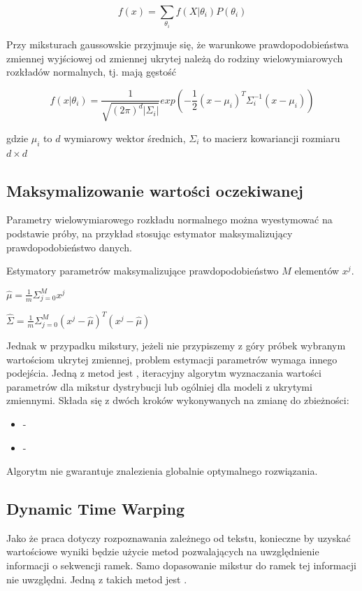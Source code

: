 $$f(x) = \sum_{\theta_i} f(X | \theta_i) P(\theta_i)$$

Przy miksturach gaussowskie przyjmuje się, że warunkowe prawdopodobieństwa zmiennej wyjściowej od zmiennej ukrytej
należą do rodziny wielowymiarowych rozkładów normalnych, tj. mają gęstość

$$f(x | \theta_i) = \frac{1}{\sqrt{(2 \pi)^d |\Sigma_i|}} exp(-\frac{1}{2} (x - \mu_i)^T \Sigma_i^{-1} (x - \mu_i))$$

gdzie $\mu_i$ to $d$ wymiarowy wektor średnich, $\Sigma_i$ to macierz kowariancji rozmiaru $d \times d$

\subsection{Maksymalizowanie wartości oczekiwanej}\label{sec:gmm}

Parametry wielowymiarowego rozkładu normalnego można wyestymować na podstawie próby, na przykład 
stosując estymator maksymalizujący prawdopodobieństwo danych.

Estymatory parametrów maksymalizujące prawdopodobieństwo $M$ elementów $x^j$.

$\hat{\mu} = \frac{1}{m} \Sigma_{j=0}^M x^{j}$

$\hat{\Sigma} = \frac{1}{m} \Sigma_{j=0}^M (x^{j} - \hat{\mu})^T (x^{j} - \hat{\mu})$

Jednak w przypadku mikstury, jeżeli nie przypiszemy z góry próbek wybranym wartościom ukrytej zmiennej, problem 
estymacji parametrów wymaga innego podejścia. Jedną z metod jest , iteracyjny 
algorytm wyznaczania wartości parametrów dla mikstur dystrybucji lub ogólniej dla modeli z ukrytymi zmiennymi. 
Składa się z dwóch kroków wykonywanych na zmianę do zbieżności:

\begin{itemize}
    \item {} -  %
    \item {} - 
\end{itemize}

Algorytm nie gwarantuje znalezienia globalnie optymalnego rozwiązania.

\subsection{Dynamic Time Warping}\label{sec:dtw}

Jako że praca dotyczy rozpoznawania zależnego od tekstu, konieczne by uzyskać wartościowe wyniki będzie
użycie metod pozwalających na uwzględnienie informacji o sekwencji ramek. Samo dopasowanie mikstur do ramek
tej informacji nie uwzględni. Jedną z takich metod jest .

